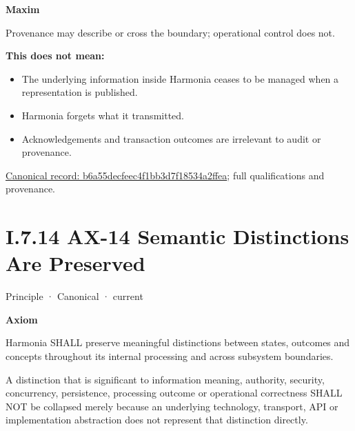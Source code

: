\par\medskip\textbf{Maxim}\par


Provenance may describe or cross the boundary; operational control does
not.



\textbf{This does not mean:}



\begin{itemize}


\item The underlying information inside Harmonia ceases to be managed when a representation is published.

\item Harmonia forgets what it transmitted.

\item Acknowledgements and transaction outcomes are irrelevant to audit or provenance.

\end{itemize}

{\footnotesize \href{../../../../continuum/motivation/principle/b6a55decfeec4f1bb3d7f18534a2ffea.md}{Canonical record: b6a55decfeec4f1bb3d7f18534a2ffea}; full qualifications and provenance.}\par
\section*{I.7.14 AX-14 Semantic Distinctions Are Preserved}
\label{navigation:I.7.14}

\label{element:d3fc6025dc7646d1b2020b51f7a44bfa}
{\small Principle · Canonical · current}\par

\par\medskip\textbf{Axiom}\par


Harmonia SHALL preserve meaningful distinctions between states, outcomes and concepts throughout its internal processing and across subsystem boundaries.



A distinction that is significant to information meaning, authority, security, concurrency, persistence, processing outcome or operational correctness SHALL NOT be collapsed merely because an underlying technology, transport, API or implementation abstraction does not represent that distinction directly.



